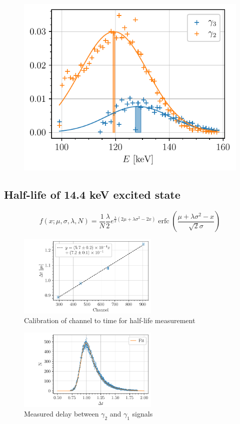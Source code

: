 \begin{figure}[htbp]
    \centering
    \includegraphics[scale=1]{figures/co57_gamma2_gamma3.pdf}
    \caption{}
    \label{fig:co57_gamma3_spectrum}
\end{figure}

\subsection{Half-life of 14.4 keV excited state}

\begin{equation}
    f(x;\mu,\sigma,\lambda, N) = \frac{1}{N} \frac{\lambda}{2} e^{\frac{\lambda}{2} (2 \mu + \lambda \sigma^2 - 2 x)}
             \operatorname{erfc} \left(\frac{\mu + \lambda \sigma^2 - x}{ \sqrt{2} \sigma}\right)
\end{equation}

\begin{figure}[h]
    \centering
    \includegraphics[width=0.6\textwidth]{figures/calibration_time_interval.pdf}    
    \caption{Calibration of channel to time for half-life measurement}
    \label{fig:calibration_halflife}
\end{figure}

\begin{figure}[h]
    \centering
    \includegraphics[width=0.6\textwidth]{figures/co57_halflife.pdf}    
    \caption{Measured delay between \(\gamma_2\) and \(\gamma_1\) signals}
    \label{fig:delay_gamma12}
\end{figure}

